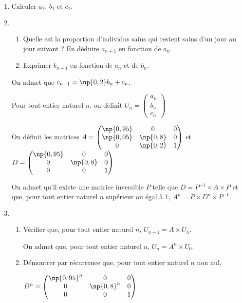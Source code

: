 \documentclass[10pt]{article}
\begin{document}
\begin{enumerate}
\item Calculer $a_1$, $b_1$ et $c_1$.
\item
	\begin{enumerate}
		\item Quelle est la proportion d'individus sains qui restent sains d'un jour au jour suivant ? En déduire $a_{n+1}$ en fonction de $a_n$.
		\item Exprimer $b_{n+1}$ en fonction de $a_n$ et de $b_n$.
	\end{enumerate}
On admet que $c_{n+1} = \np{0,2}b_n + c_n$.

Pour tout entier naturel $n$, on définit
$U_n=\begin{pmatrix}
a_n\\b_n\\c_n
\end{pmatrix}$

On définit les matrices
$A=\begin{pmatrix}
\np{0,95}&0&0\\
\np{0,05}&\np{0,8}&0\\
0&\np{0,2}&1
\end{pmatrix}$
et $D=\begin{pmatrix}
\np{0,95}&0&0\\
0&\np{0,8}&0\\
0&0&1
\end{pmatrix}$

On admet qu'il existe une matrice inversible $P$ telle que
$D=P^{-1}\times A\times P$ et que, pour tout entier naturel $n$ supérieur ou égal à 1, $A^n=P\times D^{n}\times P^{-1}$.
\item 
	\begin{enumerate}
		\item Vérifier que, pour tout entier naturel $n$,
 $U_{n+1}= A\times U_n$.

 \medskip
 
 On admet que, pour tout entier naturel $n$, $U_n=A^n\times U_0$.
 
\item Démontrer par récurrence que, pour tout entier naturel $n$ non nul,
 
$D^n=\begin{pmatrix}
 \np{0,95}^n&0&0\\
 0&\np{0,8}^n&0\\
 0&0&1
\end{pmatrix}$
	\end{enumerate}


\end{enumerate}
\end{document}
